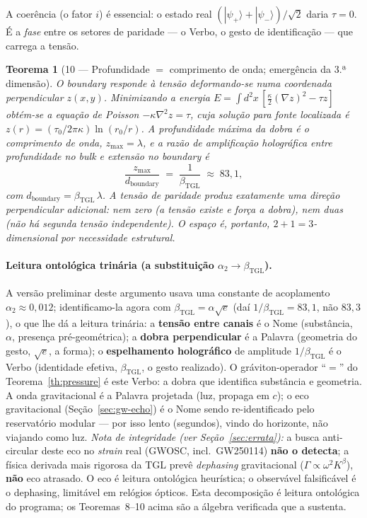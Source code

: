 \documentclass[12pt,a4paper]{article}
\newtheorem*{theoremfixed}{Teorema}
\newcommand{\betatgl}{\beta_{\text{TGL}}}
\newcommand{\TGL}{\textsc{TGL}}
\begin{document}
\noindent A coerência (o fator $i$) é essencial: o estado real
$(|\psi_{+}\rangle + |\psi_{-}\rangle)/\sqrt{2}$ daria $\tau = 0$.  É a
\emph{fase} entre os setores de paridade --- o Verbo, o gesto de identificação
--- que carrega a tensão.

\begin{theoremfixed}[10 --- Profundidade $=$ comprimento de onda; emergência da 3.ª dimensão]
\label{th:depth-wavelength}
O \emph{boundary} responde à tensão deformando-se numa coordenada perpendicular
$z(x,y)$.  Minimizando a energia
$E = \int d^{2}x\,[\tfrac{\kappa}{2}(\nabla z)^{2} - \tau z]$ obtém-se a equação
de Poisson $-\kappa\nabla^{2}z = \tau$, cuja solução para fonte localizada é
$z(r) = (\tau_{0}/2\pi\kappa)\ln(r_{0}/r)$.  A profundidade máxima da dobra é o
comprimento de onda, $z_{\max} = \lambda$, e a razão de amplificação holográfica
entre profundidade no bulk e extensão no boundary é
\begin{equation}
\frac{z_{\max}}{d_{\text{boundary}}} \;=\; \frac{1}{\betatgl} \;\approx\; 83{,}1,
\end{equation}
com $d_{\text{boundary}} = \betatgl\,\lambda$.  A tensão de paridade produz
\emph{exatamente uma} direção perpendicular adicional: nem zero (a tensão existe
e força a dobra), nem duas (não há segunda tensão independente).  O espaço é,
portanto, $2 + 1 = 3$-dimensional por necessidade estrutural.
\end{theoremfixed}

\paragraph{Leitura ontológica trinária (a substituição $\alpha_{2} \to \betatgl$).}
A versão preliminar deste argumento usava uma constante de acoplamento
$\alpha_{2} \approx 0{,}012$; identificamo-la agora com $\betatgl = \alpha\sqrt{e}$
(daí $1/\betatgl = 83{,}1$, não $83{,}3$), o que lhe dá a leitura trinária:
a \textbf{tensão entre canais} é o Nome (substância, $\alpha$, presença
pré-geométrica); a \textbf{dobra perpendicular} é a Palavra (geometria do gesto,
$\sqrt{e}$, a forma); o \textbf{espelhamento holográfico} de amplitude
$1/\betatgl$ é o Verbo (identidade efetiva, $\betatgl$, o gesto realizado).  O
gráviton-operador ``$=$'' do Teorema~\ref{th:pressure} é este Verbo: a dobra que
identifica substância e geometria.  A onda gravitacional é a Palavra projetada
(luz, propaga em $c$); o eco gravitacional (Seção~\ref{sec:gw-echo}) é o Nome
sendo re-identificado pelo reservatório modular --- por isso lento (segundos),
vindo do horizonte, não viajando como luz.  \emph{Nota de integridade (ver Seção~\ref{sec:errata}):} a busca anti-circular deste eco no \emph{strain} real (GWOSC, incl.\ GW250114) \textbf{não o detecta}; a física derivada mais rigorosa da \TGL{} prevê \emph{dephasing} gravitacional ($\Gamma\propto\omega^2 K^{\beta}$), \textbf{não} eco atrasado.  O eco é leitura ontológica heurística; o observável falsificável é o dephasing, limitável em relógios ópticos.  Esta decomposição é leitura
ontológica do programa; os Teoremas~8--10 acima
são a álgebra verificada que a sustenta.
\end{document}

